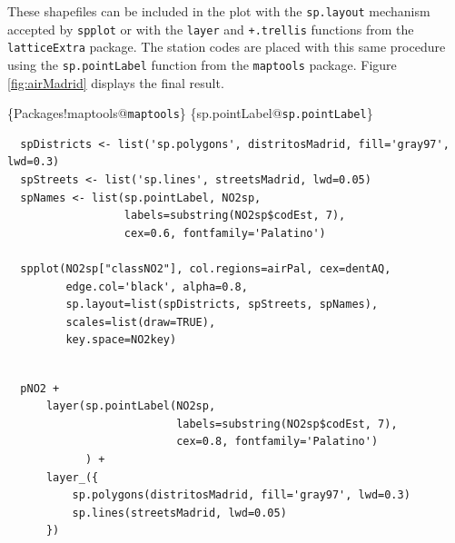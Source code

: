 These shapefiles can be included in the plot with the \texttt{sp.layout}
mechanism accepted by \texttt{spplot} or with the \texttt{layer} and \texttt{+.trellis}
functions from the \texttt{latticeExtra} package. The station codes are
placed with this same procedure using the \texttt{sp.pointLabel} function
from the \texttt{maptools} package. Figure \ref{fig:airMadrid} displays the
final result.

\begin{LaTeX}
\index\{Packages!maptools@\texttt{maptools}\}
\index\{sp.pointLabel@\texttt{sp.pointLabel}\}
\end{LaTeX}

\lstset{language=r,label= ,caption= ,captionpos=b,numbers=none}
\begin{lstlisting}
  spDistricts <- list('sp.polygons', distritosMadrid, fill='gray97', lwd=0.3)
  spStreets <- list('sp.lines', streetsMadrid, lwd=0.05)
  spNames <- list(sp.pointLabel, NO2sp,
                  labels=substring(NO2sp$codEst, 7),
                  cex=0.6, fontfamily='Palatino')
  
  spplot(NO2sp["classNO2"], col.regions=airPal, cex=dentAQ,
         edge.col='black', alpha=0.8,
         sp.layout=list(spDistricts, spStreets, spNames),
         scales=list(draw=TRUE),
         key.space=NO2key)
  
\end{lstlisting}

\lstset{language=r,label= ,caption= ,captionpos=b,numbers=none}
\begin{lstlisting}
  pNO2 +
      layer(sp.pointLabel(NO2sp,
                          labels=substring(NO2sp$codEst, 7),
                          cex=0.8, fontfamily='Palatino')
            ) +
      layer_({
          sp.polygons(distritosMadrid, fill='gray97', lwd=0.3)
          sp.lines(streetsMadrid, lwd=0.05)
      })
\end{lstlisting}


